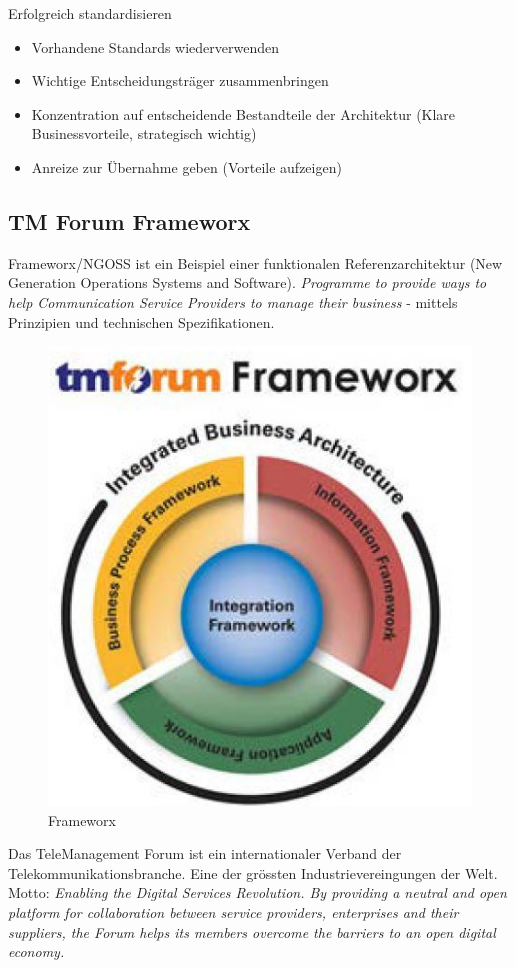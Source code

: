 Erfolgreich standardisieren
\begin{itemize}
	\item Vorhandene Standards wiederverwenden
	\item Wichtige Entscheidungsträger zusammenbringen
	\item Konzentration auf entscheidende Bestandteile der Architektur (Klare Businessvorteile, strategisch wichtig)
	\item Anreize zur Übernahme geben (Vorteile aufzeigen)
\end{itemize}

\subsection{TM Forum Frameworx}

Frameworx/NGOSS ist ein Beispiel einer funktionalen Referenzarchitektur (New Generation Operations Systems and Software). \textit{Programme to provide ways to help Communication Service Providers to manage their business} - mittels Prinzipien und technischen Spezifikationen.

\begin{figure}[h!]
\centering
\includegraphics[width=0.7\linewidth]{fig/frameworx}
\caption{Frameworx}
\label{fig:frameworx}
\end{figure}

Das TeleManagement Forum ist ein internationaler Verband der Telekommunikationsbranche. Eine der grössten Industrievereingungen der Welt. Motto: \textit{Enabling the Digital Services Revolution. By providing a neutral and open platform for collaboration between service providers, enterprises and their suppliers, the Forum helps its members overcome the barriers to an open digital economy.}

